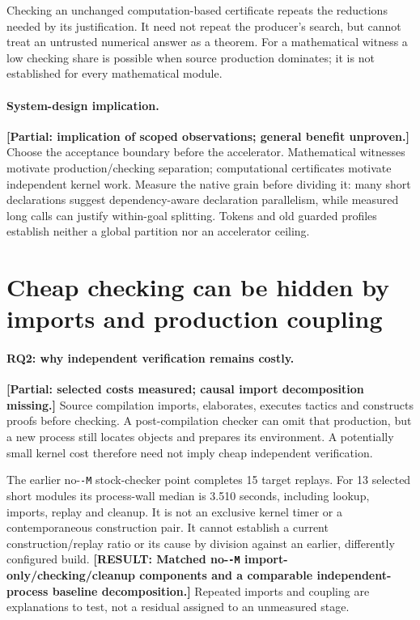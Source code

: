 \documentclass[10pt,twocolumn]{article}
\newcommand{\missing}[1]{\textbf{[RESULT: #1]}}
\newcommand{\partialev}[1]{\textbf{[Partial: #1]}}
\begin{document}
Checking an unchanged computation-based certificate repeats the reductions
needed by its justification. It need not repeat the producer's search, but
cannot treat an untrusted numerical answer as a theorem.
For a mathematical witness a low checking share is possible when source
production dominates; it is not established for every mathematical module.

\paragraph{System-design implication.}
\partialev{implication of scoped observations; general benefit unproven.}
Choose the acceptance boundary before the accelerator.
Mathematical witnesses motivate production/checking separation;
computational certificates motivate independent kernel work.
Measure the native grain before dividing it: many short declarations suggest
dependency-aware declaration parallelism, while measured long calls can
justify within-goal splitting.
Tokens and old guarded profiles establish neither a global partition nor
an accelerator ceiling.

\section{Cheap checking can be hidden by imports and production coupling}
\label{sec:decoupled}
\paragraph{RQ2: why independent verification remains costly.}
\partialev{selected costs measured; causal import decomposition missing.}
Source compilation imports, elaborates, executes tactics and constructs
proofs before checking. A post-compilation checker can omit that production,
but a new process still locates objects and prepares its environment.
A potentially small kernel cost therefore need not imply cheap independent
verification.

The earlier no-\texttt{-M} stock-checker point completes 15 target replays.
For 13 selected short modules its process-wall median is 3.510 seconds,
including lookup, imports, replay and cleanup.
It is not an exclusive kernel timer or a contemporaneous construction pair.
It cannot establish a current construction/replay ratio or its cause
by division against an earlier, differently configured build.
\missing{Matched no-\texttt{-M} import-only/checking/cleanup components
and a comparable independent-process baseline decomposition.}
Repeated imports and coupling are explanations to test, not a residual
assigned to an unmeasured stage.
\end{document}
